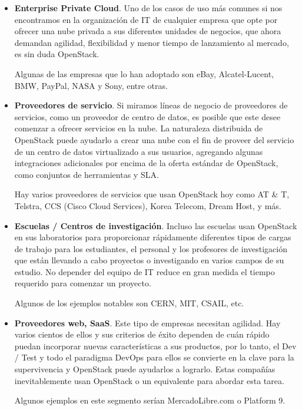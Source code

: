\begin{itemize}
\item \textbf{Enterprise Private Cloud}. Uno de los casos de uso más comunes si nos encontramos en la organización de IT de cualquier empresa que opte por ofrecer una nube privada a sus diferentes unidades de negocios, que ahora demandan agilidad, flexibilidad y menor tiempo de lanzamiento al mercado, es sin duda OpenStack.

Algunas de las empresas que lo han adoptado son eBay, Alcatel-Lucent, BMW, PayPal, NASA y Sony, entre otras.

\item \textbf{Proveedores de servicio}. Si miramos líneas de negocio de proveedores de servicios, como un proveedor de centro de datos, es posible que este desee comenzar a ofrecer servicios en la nube. La naturaleza distribuida de OpenStack puede ayudarlo a crear una nube con el fin de proveer del servicio de un centro de datos virtualizado a sus usuarios, agregando algunas integraciones adicionales por encima de la oferta estándar de OpenStack, como conjuntos de herramientas y SLA.

Hay varios proveedores de servicios que usan OpenStack hoy como AT \& T, Telstra, CCS (Cisco Cloud Services), Korea Telecom, Dream Host, y más.

\item\textbf{Escuelas / Centros de investigación}. Incluso las escuelas usan OpenStack en sus laboratorios para proporcionar rápidamente diferentes tipos de cargas de trabajo para los estudiantes, el personal y los profesores de investigación que están llevando a cabo proyectos o investigando en varios campos de su estudio. No depender del equipo de IT reduce en gran medida el tiempo requerido para comenzar un proyecto.

Algunos de los ejemplos notables son CERN, MIT, CSAIL, etc.

\item \textbf{Proveedores web, SaaS}. Este tipo de empresas necesitan agilidad. Hay varios cientos de ellos y sus criterios de éxito dependen de cuán rápido puedan incorporar nuevas características a sus productos, por lo tanto, el Dev / Test y todo el paradigma DevOps para ellos se convierte en la clave para la supervivencia y OpenStack puede ayudarlos a lograrlo. Estas compañías inevitablemente usan OpenStack o un equivalente para abordar esta tarea.

Algunos ejemplos en este segmento serían MercadoLibre.com o Platform 9.
\end{itemize}

